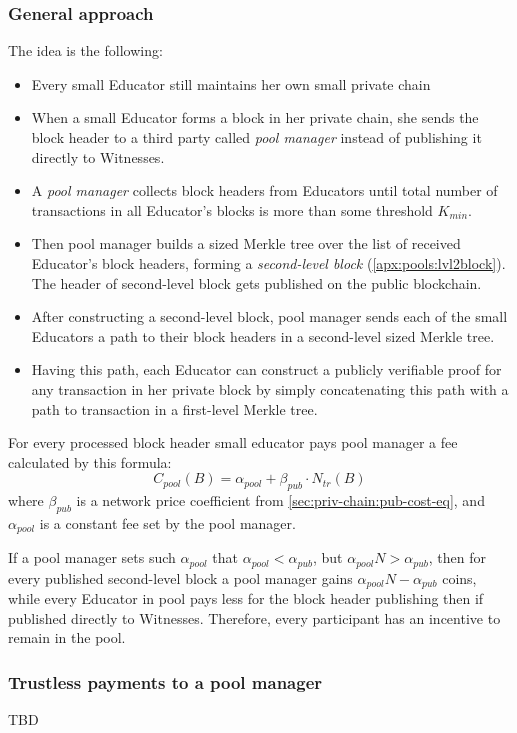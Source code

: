 \subsubsection{General approach}

The idea is the following:

\begin{itemize}
\item Every small Educator still maintains her own small private chain
\item When a small Educator forms a block in her private chain, she sends the
  block header to a third party called \textit{pool manager} instead of
  publishing it directly to Witnesses.
\item A \textit{pool manager} collects block headers from Educators until
  total number of transactions in all Educator's blocks is more than some
  threshold $K_{min}$.
\item Then pool manager builds a sized Merkle tree over the list of received
  Educator's block headers, forming a \textit{second-level block}
  (\ref{apx:pools:lvl2block}). The header of second-level block gets published
  on the public blockchain.
\item After constructing a second-level block, pool manager sends each of the
  small Educators a path to their block headers in a second-level sized Merkle tree.
\item Having this path, each Educator can construct a publicly verifiable proof
  for any transaction in her private block by simply concatenating this path
  with a path to transaction in a first-level Merkle tree.
\end{itemize}

For every processed block header small educator pays pool manager a fee
calculated by this formula:
\begin{equation}\label{apx:pools:pools-cost-eq}
  C_{pool}(B) = \alpha_{pool} + \beta_{pub} \cdot N_{tr}(B)
\end{equation}
where $\beta_{pub}$ is a network price coefficient from
\ref{sec:priv-chain:pub-cost-eq}, and $\alpha_{pool}$ is a constant fee set by
the pool manager.

If a pool manager sets such $\alpha_{pool}$ that
$\alpha_{pool} < \alpha_{pub}$, but $\alpha_{pool} N > \alpha_{pub}$, then for
every published second-level block a pool manager gains
$\alpha_{pool} N - \alpha_{pub}$ coins, while every Educator in pool pays less
for the block header publishing then if published directly to Witnesses.
Therefore, every participant has an incentive to remain in the pool.

\subsubsection{Trustless payments to a pool manager}

TBD
